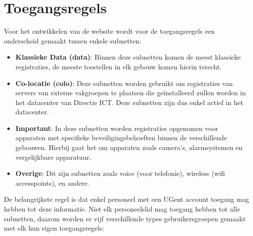 \section{Toegangsregels}
\label{toegangsregels}
Voor het ontwikkelen van de website wordt voor de toegangsregels een onderscheid gemaakt tussen enkele subnetten: 
\begin{itemize}
    \item \textbf{Klassieke Data (data)}: Binnen deze subnetten komen de meest klassieke registraties, de meeste toestellen in elk gebouw komen hierin terecht.
    \item \textbf{Co-locatie (colo)}: Deze subnetten worden gebruikt om registraties van servers van externe vakgroepen te plaatsen die geïnstalleerd zullen worden in het datacenter van Directie ICT. Deze subnetten zijn dus enkel actief in het datacenter.
    \item \textbf{Important}: In deze subnetten worden registraties opgenomen voor apparaten met specifieke beveiligingsbehoeften binnen de verschillende gebouwen. Hierbij gaat het om apparaten zoals camera's, alarmsystemen en vergelijkbare apparatuur.
    \item \textbf{Overige}: Dit zijn subnetten zoals voice (voor telefonie), wireless (wifi accesspoints), en andere.
\end{itemize} 
De belangrijkste regel is dat enkel personeel met een UGent account toegang mag hebben tot deze informatie.
Niet elk personeelslid mag toegang hebben tot alle subnetten, daarom worden er vijf verschillende types gebruikersgroepen gemaakt met elk hun eigen toegangsregels:
